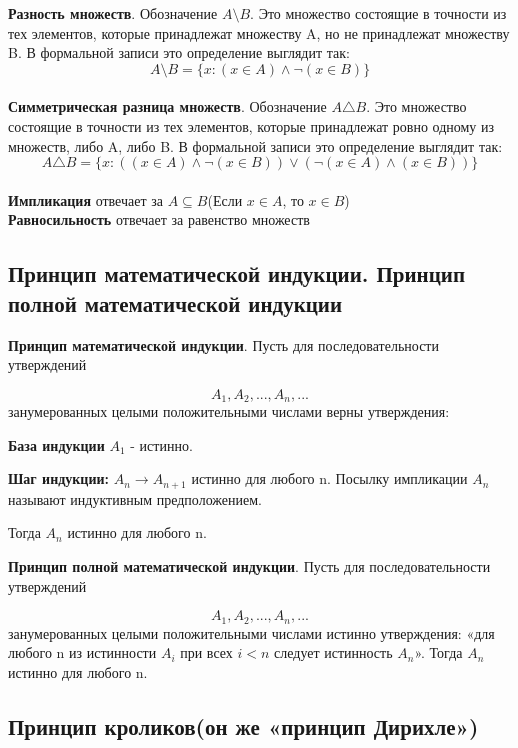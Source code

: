\documentclass[a4paper, 10pt]{article}
\begin{document}
\textbf{Разность множеств}. Обозначение $A \setminus B$. Это множество состоящие в точности из тех элементов, которые принадлежат множеству A, но не принадлежат множеству B. В формальной записи это определение выглядит так:
$$A \setminus B = \{x \colon (x \in A) \wedge \neg (x \in B)\}$$ \\

\textbf{Симметрическая разница множеств}. Обозначение $A \triangle B$. Это множество состоящие в точности из тех элементов, которые принадлежат ровно одному из множеств, либо A, либо B. В формальной записи это определение выглядит так:
$$A \triangle B = \{x \colon ((x \in A) \wedge \neg (x \in B)) \vee (\neg (x \in A) \wedge (x \in B))\}$$ \\


\textbf{Импликация} отвечает за $A \subseteq B$(Если $x \in A$, то $x \in B$)\\

\textbf{Равносильность} отвечает за равенство множеств



\subsection{Принцип математической индукции. Принцип полной математической индукции}

\textbf{Принцип математической индукции}. Пусть для последовательности утверждений

$$A_1, A_2, ..., A_n, ...$$ занумерованных целыми положительными числами верны утверждения:

\textbf{База индукции} $A_1$ - истинно.

\textbf{Шаг индукции:} $A_n \to A_{n + 1}$ истинно для любого n. Посылку импликации $A_n$ называют индуктивным предположением.

Тогда $A_n$ истинно для любого n.


\textbf{Принцип полной математической индукции}. Пусть для последовательности утверждений

$$A_1, A_2, ..., A_n, ...$$ занумерованных целыми положительными числами истинно утверждения: «для любого n из истинности $A_i$ при всех $i < n$ следует истинность $A_n$». Тогда $A_n$ истинно для любого n.


\subsection{Принцип кроликов(он же «принцип Дирихле»)}
\end{document}
